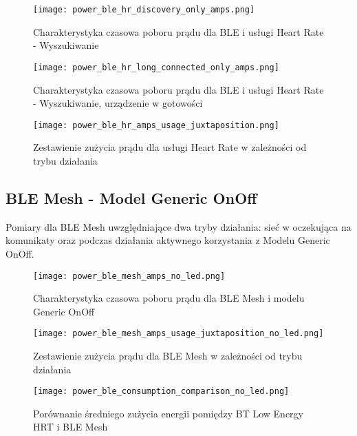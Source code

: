\lipsum[1-3]
\begin{figure}[!htb]
	\centering \texttt{[image: power\_ble\_hr\_discovery\_only\_amps.png]}
	\caption{Charakterystyka czasowa poboru prądu dla BLE i usługi Heart Rate - Wyszukiwanie}
	\label{rys:power_ble_hr_discovery_only_amps}
\end{figure}

\lipsum[1-3]
\begin{figure}[!htb]
	\centering \texttt{[image: power\_ble\_hr\_long\_connected\_only\_amps.png]}
	\caption{Charakterystyka czasowa poboru prądu dla BLE i usługi Heart Rate - Wyszukiwanie, urządzenie w gotowości}
	\label{rys:power_ble_hr_long_connected_only_amps}
\end{figure}


\lipsum[1-2]
\begin{figure}[!htb]
	\centering \texttt{[image: power\_ble\_hr\_amps\_usage\_juxtaposition.png]}
	\caption{Zestawienie zużycia prądu dla usługi Heart Rate w zależności od trybu działania}
	\label{rys:power_ble_hr_amps_usage_juxtaposition}
\end{figure}
\lipsum[1-3]

\subsection{BLE Mesh - Model Generic OnOff}

Pomiary dla BLE Mesh uwzględniające dwa tryby działania: sieć w oczekująca na komunikaty oraz podczas działania aktywnego korzystania z Modelu Generic OnOff.

\begin{figure}[!htb]
	\centering \texttt{[image: power\_ble\_mesh\_amps\_no\_led.png]} 
	\caption{Charakterystyka czasowa poboru prądu dla BLE Mesh i modelu Generic OnOff}
	\label{rys:power_ble_mesh_amps}
\end{figure}

\lipsum[1-3]
\begin{figure}[!htb]
	\centering \texttt{[image: power\_ble\_mesh\_amps\_usage\_juxtaposition\_no\_led.png]} 
	\caption{Zestawienie zużycia prądu dla BLE Mesh w zależności od trybu działania}
	\label{rys:power_ble_mesh_amps_usage_juxtaposition}
\end{figure}

\lipsum[1-3]
\begin{figure}[!htb]
	\centering \texttt{[image: power\_ble\_consumption\_comparison\_no\_led.png]} 
	\caption{Porównanie średniego zużycia energii pomiędzy BT Low Energy HRT i BLE Mesh}
	\label{rys:power_ble_consumption_comparison}
\end{figure}



